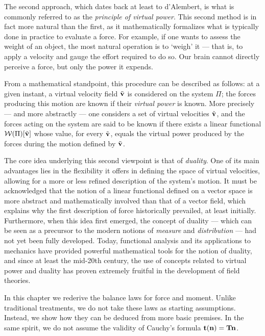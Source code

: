 The second approach, which dates back at least to d'Alembert, is what is commonly referred to as the \textit{principle of virtual power}. This second method is in fact more natural than the first, as it mathematically formalizes what is typically done in practice to evaluate a force. For example, if one wants to assess the weight of an object, the most natural operation is to `weigh' it --- that is, to apply a velocity and gauge the effort required to do so. Our brain cannot directly perceive a force, but only the power it expends.

From a mathematical standpoint, this procedure can be described as follows: at a given instant, a virtual velocity field \( \tilde{\mathbf{v}} \) is considered on the system \( \Pi \); the forces producing this motion are known if their \textit{virtual power} is known. More precisely --- and more abstractly --- one considers a set  of virtual velocities \( \tilde{\mathbf{v}} \), and the forces acting on the system are said to be known if there exists a linear functional \( \mathcal{W}(\Pi)[\tilde{\mathbf{v}}] \) whose value, for every \( \tilde{\mathbf{v}} \), equals the virtual power produced by the forces during the motion defined by \( \tilde{\mathbf{v}} \).

The core idea underlying this second viewpoint is that of \textit{duality}. One of its main advantages lies in the flexibility it offers in defining the space of virtual velocities, allowing for a more or less refined description of the system's motion.  It must be acknowledged that the notion of a linear functional defined on a vector space is more abstract and mathematically involved than that of a vector field, which explains why the first description of force historically prevailed, at least initially. Furthermore, when this idea first emerged, the concept of duality --- which can be seen as a precursor to the modern notions of \textit{measure} and \textit{distribution} --- had not yet been fully developed. Today, functional analysis and its applications to mechanics have provided powerful mathematical tools for the notion of duality, and since at least the mid-20th century, the use of concepts related to virtual power and duality has proven extremely fruitful in the development of field theories.


In this chapter we rederive the balance laws for force and moment. Unlike traditional treatments, we do not take these laws as starting assumptions. Instead, we show how they can be deduced from more basic premises. In the same spirit, we do not assume the validity of Cauchy’s formula $\mathbf{t}(\mathbf{n})=\mathbf{T} \mathbf{n}$.


